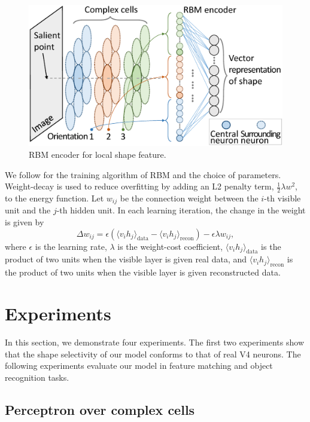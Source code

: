 \documentclass[twocolumn]{article}
\begin{document}
\begin{figure}[!t]
\centerline{\includegraphics[width=0.99\linewidth]{fig6.eps}} 
\caption{RBM encoder for local shape feature.}
\label{fig:6}
\end{figure}

We follow \cite{hinton2010} for the training algorithm of RBM and the choice of parameters.
Weight-decay is used to reduce overfitting by adding an L2 penalty term, $\frac{1}{2}\lambda w^2$, to the energy function.
Let $w_{ij}$ be the connection weight between the $i$-th visible unit and the $j$-th hidden unit.
In each learning iteration, the change in the weight is given by
\begin{equation}
\Delta w_{ij}=\epsilon\left(\langle v_i h_j\rangle_\text{data}-\langle v_i h_j\rangle_\text{recon}\right)
-\epsilon\lambda w_{ij},
\end{equation}
where $\epsilon$ is the learning rate, $\lambda$ is the weight-cost coefficient,
$\langle v_i h_j\rangle_\text{data}$ is the product of two units when the visible layer is given real data,
and $\langle v_i h_j\rangle_\text{recon}$ is the product of two units when the visible layer is given reconstructed data.

\section{Experiments}\label{sec:4}

In this section, we demonstrate four experiments.
The first two experiments show that the shape selectivity of our model conforms to that of real V4 neurons.
The following experiments evaluate our model in feature matching and object recognition tasks.

\subsection{Perceptron over complex cells}
\end{document}
